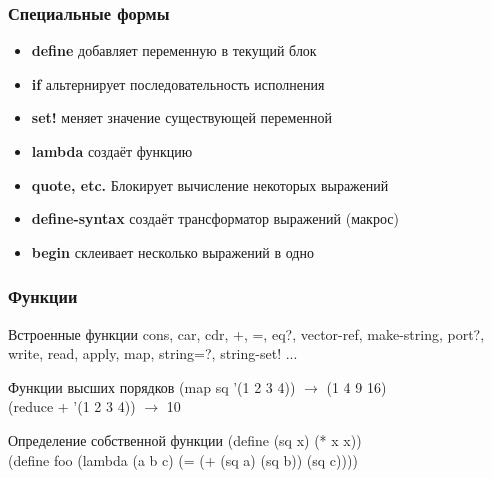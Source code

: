 \documentclass[16pt,pdf,unicode]{beamer}
\begin{document}
\begin{frame}
\frametitle{Специальные формы}
\begin{itemize}
  \item {\bf define} добавляет переменную в текущий блок
  \item {\bf if} альтернирует последовательность исполнения
  \item {\bf set!} меняет значение существующей переменной
  \item {\bf lambda} создаёт функцию
  \item {\bf quote, etc.} Блокирует вычисление некоторых выражений
  \item {\bf define-syntax} создаёт трансформатор выражений (макрос)
  \item {\bf begin} склеивает несколько выражений в одно
\end{itemize}
\end{frame}

\begin{frame}
\frametitle{Функции}
\begin{block}{Встроенные функции}
cons, car, cdr, +, =, eq?, vector-ref, make-string, port?, 
write, read, apply, map, string=?, string-set! ...
\end{block}
\begin{block}{Функции высших порядков}
(map sq '(1 2 3 4)) $\rightarrow$ (1 4 9 16)\\
(reduce + '(1 2 3 4)) $\rightarrow$ 10
\end{block}
\begin{block}{Определение собственной функции}
(define (sq x) (* x x))\\
(define foo (lambda (a b c) (= (+ (sq a) (sq b)) (sq c))))
\end{block}
\end{frame}
\end{document}
